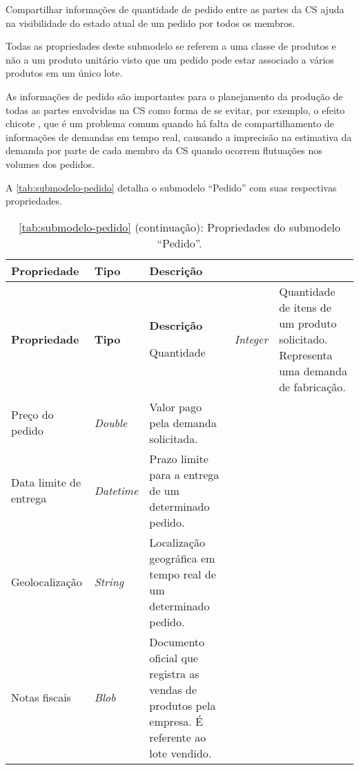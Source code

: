 Compartilhar informações de quantidade de pedido entre as partes da CS ajuda na visibilidade do estado atual de um pedido por todos os membros.

Todas as propriedades deste submodelo se referem a uma classe de produtos e não a um produto unitário visto que um pedido pode estar associado a vários produtos em um único lote.

As informações de pedido são importantes para o planejamento da produção de todas as partes envolvidas na CS como forma de se evitar, por exemplo, o efeito chicote \cite{lee1997bullwhip}, que é um problema comum quando há falta de compartilhamento de informações de demandas em tempo real, causando a imprecisão na estimativa da demanda por parte de cada membro da CS quando ocorrem flutuações nos volumes dos pedidos.

A \autoref{tab:submodelo-pedido} detalha o submodelo ``Pedido'' com suas respectivas propriedades.

\begin{longtable}{|p{}|p{}|p{}|}

	\caption{\label{tab:submodelo-pedido} Propriedades do submodelo ``Pedido''.}
	\\ \hline \textbf{Propriedade} & \textbf{Tipo} & \textbf{Descrição}
	\endfirsthead

	\caption*{\autoref{tab:submodelo-pedido} (continuação): Propriedades do submodelo ``Pedido''.}
	\\ \hline \textbf{Propriedade} & \textbf{Tipo}    & \textbf{Descrição}
	\endhead

	\hline Quantidade & \textit{Integer} & Quantidade de itens de um produto solicitado. Representa uma demanda de fabricação.

	\\ \hline Preço do pedido & \textit{Double} & Valor pago pela demanda solicitada.

	\\ \hline Data limite de entrega & \textit{Datetime} & Prazo limite para a entrega de um determinado pedido.

	\\ \hline Geolocalização & \textit{String} & Localização geográfica em tempo real de um determinado pedido.

	\\ \hline Notas fiscais & \textit{Blob} & Documento oficial que registra as vendas de produtos pela empresa. É referente ao lote vendido.

	\\ \hline
\end{longtable}


